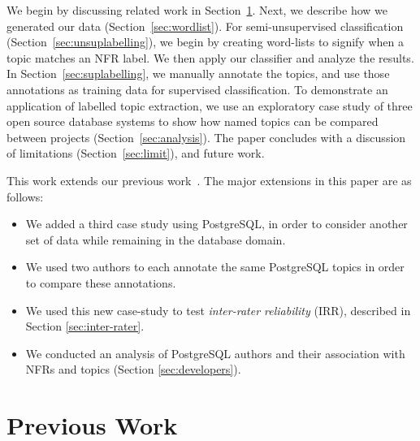 \documentclass[smallextended]{svjour3}       %
\begin{document}
We begin by discussing related work in Section~\ref{sec:related}.
Next, we describe how we generated our data (Section~\ref{sec:wordlist}). For semi-unsupervised classification (Section~\ref{sec:unsuplabelling}), we
begin by creating word-lists to signify when a topic matches an NFR label. We then apply our classifier and analyze the results. 
In Section~\ref{sec:suplabelling}, we manually annotate the topics, and use those annotations as training data for supervised classification.  
To demonstrate an application of labelled topic extraction, we use an exploratory case study of three open source database systems to show how named
topics can be compared between projects  (Section~\ref{sec:analysis}). 
The paper concludes with a discussion of limitations (Section~\ref{sec:limit}), and future work.

This work extends our previous work~\cite{msr2011}. The major extensions in this paper are as follows:
\begin{itemize}
	\item We added a third case study using PostgreSQL, in order to consider another set of data while remaining in the database domain.
	\item We used two authors to each annotate the same PostgreSQL topics in order to compare
these annotations. 
	\item We used this new case-study to test \emph{inter-rater
          reliability} (IRR), described in Section \ref{sec:inter-rater}. 
	\item We conducted an analysis of PostgreSQL authors and their association with NFRs and
topics (Section \ref{sec:developers}).
\end{itemize}

\section{Previous Work}
\label{sec:related}
\end{document}

